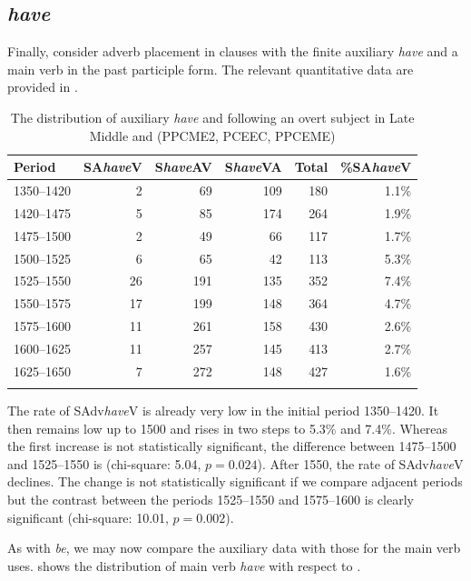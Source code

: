 \documentclass[output=paper]{langsci/langscibook}
\begin{document}
\subsection{\emph{have}}

Finally, consider adverb placement in clauses with the finite auxiliary
\emph{have} and a main verb in the past participle form. The relevant
quantitative data are provided in .

\begin{table}
\caption{The distribution of auxiliary \emph{have} and  following an
overt subject in Late Middle and  (PPCME2, PCEEC,
PPCEME)\label{tab:key:09.4}}
\begin{tabular}{lrrrrr}
\lsptoprule
{Period} & {SA\emph{have}V} & {S\emph{have}AV} & {S\emph{have}VA} & {Total} & {\%SA\emph{have}V}\\
\midrule
1350--1420 & 2 & 69 & 109 & 180 & 1.1\%\\
1420--1475 & 5 & 85 & 174 & 264 & 1.9\%\\
1475--1500 & 2 & 49 & 66 & 117 & 1.7\%\\
1500--1525 & 6 & 65 & 42 & 113 & 5.3\%\\
1525--1550 & 26 & 191 & 135 & 352 & 7.4\%\\
1550--1575 & 17 & 199 & 148 & 364 & 4.7\%\\
1575--1600 & 11 & 261 & 158 & 430 & 2.6\%\\
1600--1625 & 11 & 257 & 145 & 413 & 2.7\%\\
1625--1650 & 7 & 272 & 148 & 427 & 1.6\%\\
\lspbottomrule
\end{tabular}
\end{table}

The rate of SAdv\emph{have}V is already very low in the initial period
1350--1420. It then remains low up to 1500 and rises in two steps to 5.3\% and
7.4\%. Whereas the first increase is not statistically significant, the
difference between 1475--1500 and 1525--1550 is (chi-square: 5.04, $p = 0.024$).
After 1550, the rate of SAdv\emph{have}V declines. The change is not
statistically significant if we compare adjacent periods but the contrast
between the periods 1525--1550 and 1575--1600 is clearly significant
(chi-square: 10.01, $p = 0.002$).

As with \emph{be}, we may now compare the auxiliary data with those for the
main verb uses.  shows the distribution of main verb
\emph{have} with respect to .
\end{document}
